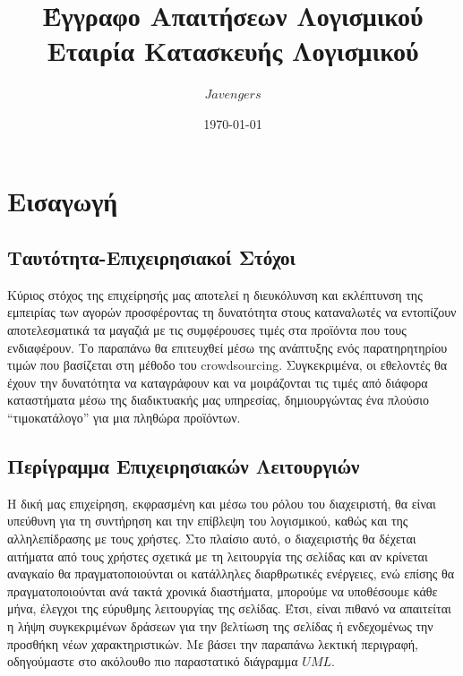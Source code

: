 \documentclass[12pt]{article}
\begin{document}
\title{Έγγραφο Απαιτήσεων Λογισμικού \\ Eταιρία Kατασκευής Λογισμικού}
\date{\today}
\author{$Javengers$}
\maketitle

\tableofcontents

\section{Εισαγωγή}

\subsection{Ταυτότητα-Επιχειρησιακοί Στόχοι}

Κύριος στόχος της επιχείρησής μας αποτελεί η διευκόλυνση και εκλέπτυνση της εμπειρίας των αγορών προσφέροντας τη δυνατότητα στους καταναλωτές να εντοπίζουν αποτελεσματικά τα μαγαζιά με τις συμφέρουσες τιμές στα προϊόντα που τους ενδιαφέρουν. Το παραπάνω θα επιτευχθεί μέσω της ανάπτυξης ενός παρατηρητηρίου τιμών που βασίζεται στη μέθοδο του crowdsourcing. Συγκεκριμένα, οι εθελοντές θα έχουν την δυνατότητα να καταγράφουν και να μοιράζονται τις τιμές από διάφορα καταστήματα μέσω της διαδικτυακής μας υπηρεσίας, δημιουργώντας ένα πλούσιο “τιμοκατάλογο” για μια πληθώρα προϊόντων.

\subsection{Περίγραμμα Επιχειρησιακών Λειτουργιών}

Η δική μας επιχείρηση, εκφρασμένη και μέσω του ρόλου του διαχειριστή, θα είναι υπεύθυνη για τη συντήρηση και την επίβλεψη του λογισμικού, καθώς και της αλληλεπίδρασης με τους χρήστες. Στο πλαίσιο αυτό, ο διαχειριστής θα δέχεται αιτήματα από τους χρήστες σχετικά με τη λειτουργία της σελίδας και αν κρίνεται αναγκαίο θα πραγματοποιούνται οι κατάλληλες διαρθρωτικές ενέργειες, ενώ επίσης θα πραγματοποιούνται ανά τακτά χρονικά διαστήματα, μπορούμε να υποθέσουμε κάθε μήνα, έλεγχοι της εύρυθμης λειτουργίας της σελίδας. Έτσι, είναι πιθανό να απαιτείται η λήψη συγκεκριμένων δράσεων για την βελτίωση της σελίδας ή ενδεχομένως την προσθήκη νέων χαρακτηριστικών. Με βάσει την παραπάνω λεκτική περιγραφή, οδηγούμαστε στο ακόλουθο πιο παραστατικό διάγραμμα $UML$.
\end{document}
